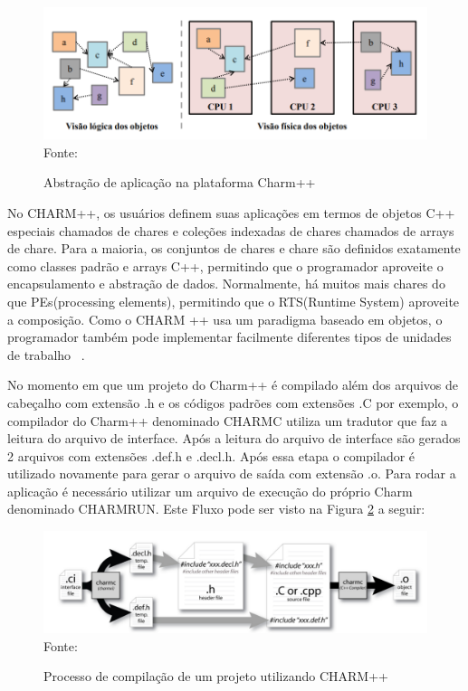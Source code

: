  \begin{figure}[!htb]
 	\centering
	\caption{Abstração de aplicação na plataforma Charm++}
 	\includegraphics[scale=0.50]{figuras/abstracao.png}
	Fonte: \cite{pillaNatalRN}
 	\label{img-abstracao}
 \end{figure}
 
 No CHARM++, os usuários definem suas aplicações em termos de objetos C++ especiais chamados de chares e coleções indexadas de chares chamados de arrays de chare. Para a maioria, os conjuntos de chares e chare são definidos exatamente como classes padrão e arrays C++, permitindo que o programador aproveite o encapsulamento e abstração de dados. Normalmente, há muitos mais chares do que PEs(processing elements), permitindo que o RTS(Runtime System) aproveite a composição. Como o CHARM ++ usa um paradigma baseado em objetos, o programador também pode implementar facilmente diferentes tipos de unidades de trabalho ~\cite{acun2014parallel}.
 
 No momento em que um projeto do Charm++ é compilado além dos arquivos de cabeçalho com extensão .h e os códigos padrões com extensões .C por exemplo,  o compilador do Charm++ denominado CHARMC utiliza um tradutor que faz a leitura do arquivo de interface. Após a leitura do arquivo de interface são gerados 2 arquivos com extensões .def.h e .decl.h. Após essa etapa o compilador é utilizado novamente para gerar o arquivo de saída com extensão .o. Para rodar a aplicação é necessário utilizar um arquivo de execução do próprio Charm denominado CHARMRUN. Este Fluxo pode ser visto na Figura \ref{img-compiler} a seguir:
 
 \begin{figure}[!htb]
	\centering
	\caption{Processo de compilação de um projeto utilizando CHARM++}
	\includegraphics[scale=0.40]{figuras/compile.png}
	\\ Fonte: \cite{compileIMG}
	\label{img-compiler}
\end{figure}

